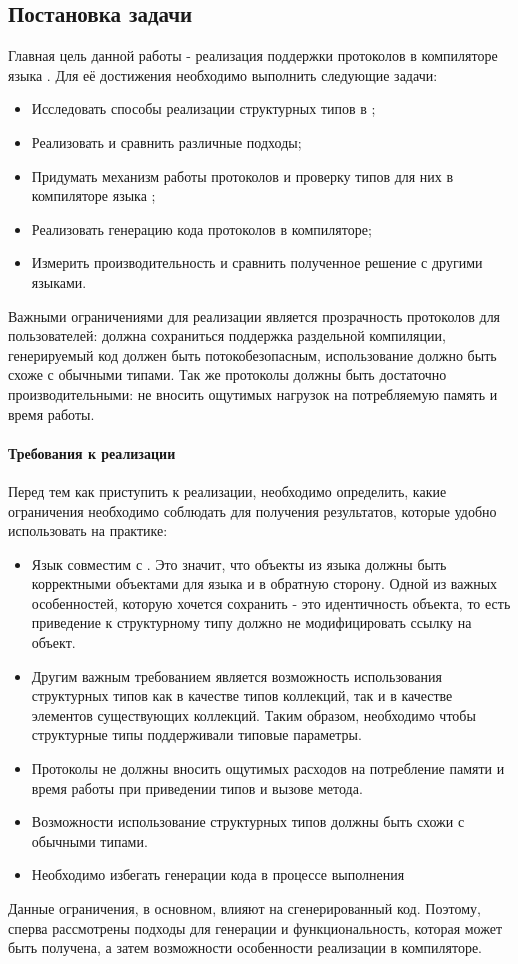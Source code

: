 \subsection{Постановка задачи}
Главная цель данной работы - реализация поддержки протоколов в компиляторе языка . Для её достижения необходимо выполнить следующие задачи:
\begin{itemize}
    \item Исследовать способы реализации структурных типов в ;
    \item Реализовать и сравнить различные подходы;
    \item Придумать механизм работы протоколов и проверку типов для них в компиляторе языка ;
    \item Реализовать генерацию кода протоколов в компиляторе;
    \item Измерить производительность и сравнить полученное решение с другими языками.
\end{itemize}

Важными ограничениями для реализации является прозрачность протоколов для пользователей: должна сохраниться поддержка раздельной компиляции, генерируемый код должен быть потокобезопасным, использование должно быть схоже с обычными типами. Так же протоколы должны быть достаточно производительными: не вносить ощутимых нагрузок на потребляемую память и время работы.

\paragraph{Требования к реализации}
Перед тем как приступить к реализации, необходимо определить, какие ограничения необходимо соблюдать для получения результатов, которые удобно использовать на практике:

\begin{itemize}
  \item Язык  совместим с . Это значит, что объекты из языка  должны быть корректными объектами для языка  и в обратную сторону. Одной из важных особенностей, которую хочется сохранить - это идентичность объекта, то есть приведение к структурному типу должно не модифицировать ссылку на объект.
\item Другим важным требованием является возможность использования структурных типов как в качестве типов коллекций, так и в качестве элементов существующих коллекций. Таким образом, необходимо чтобы структурные типы поддерживали типовые параметры.
\item Протоколы не должны вносить ощутимых расходов на потребление памяти и время работы при приведении типов и вызове метода.
\item Возможности использование структурных типов должны быть схожи с обычными типами.
\item Необходимо избегать генерации кода в процессе выполнения
\end{itemize}

Данные ограничения, в основном, влияют на сгенерированный код. Поэтому, сперва рассмотрены подходы для генерации и функциональность, которая может быть получена, а затем возможности особенности реализации в компиляторе.

